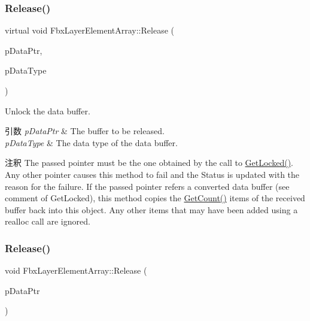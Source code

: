 \subsubsection{\texorpdfstring{Release()}{Release()}\hspace{0.1cm}{\footnotesize\ttfamily [1/3]}}
{\footnotesize\ttfamily virtual void Fbx\+Layer\+Element\+Array\+::\+Release (\begin{DoxyParamCaption}\item[{void $\ast$$\ast$}]{p\+Data\+Ptr,  }\item[{\hyperlink{fbxpropertytypes_8h_a73913a5ddfb20e57c6f25e9e6784bd92}{E\+Fbx\+Type}}]{p\+Data\+Type }\end{DoxyParamCaption})\hspace{0.3cm}{\ttfamily [virtual]}}

Unlock the data buffer. 
\begin{DoxyParams}{引数}
{\em p\+Data\+Ptr} & The buffer to be released. \\
\hline
{\em p\+Data\+Type} & The data type of the data buffer. \\
\hline
\end{DoxyParams}
\begin{DoxyRemark}{注釈}
The passed pointer must be the one obtained by the call to \hyperlink{class_fbx_layer_element_array_a34ac50b866b0615109329c114e612b83}{Get\+Locked()}. Any other pointer causes this method to fail and the Status is updated with the reason for the failure. If the passed pointer refers a converted data buffer (see comment of Get\+Locked), this method copies the \hyperlink{class_fbx_layer_element_array_acd195095246f6d886d55fd0aa7129b2d}{Get\+Count()} items of the received buffer back into this object. Any other items that may have been added using a realloc call are ignored. 
\end{DoxyRemark}
\mbox{\label{class_fbx_layer_element_array_a9706ee3edb65ea08c7b95b5c83224371}} 
\subsubsection{\texorpdfstring{Release()}{Release()}\hspace{0.1cm}{\footnotesize\ttfamily [2/3]}}
{\footnotesize\ttfamily void Fbx\+Layer\+Element\+Array\+::\+Release (\begin{DoxyParamCaption}\item[{void $\ast$$\ast$}]{p\+Data\+Ptr }\end{DoxyParamCaption})\hspace{0.3cm}{\ttfamily [inline]}}


